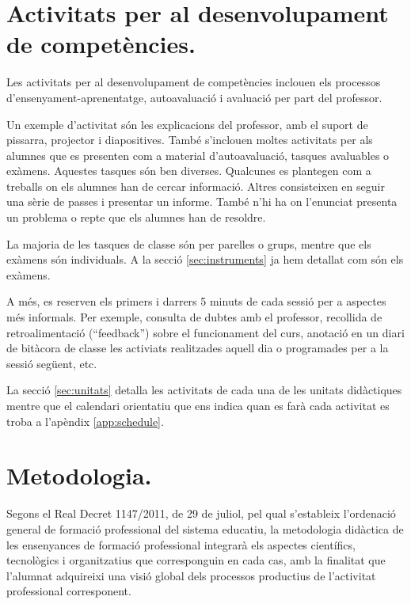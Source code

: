 \documentclass[catalan, a4paper, 12pt, titlepage]{article}
\begin{document}
\section{Activitats per al desenvolupament de competències.}
\label{sec:activitats}

Les activitats per al desenvolupament de competències inclouen els processos d'ensenyament-aprenentatge, autoavaluació i avaluació per part del professor.

Un exemple d'activitat són les explicacions del professor, amb el suport de pissarra, projector i diapositives.
També s'inclouen moltes activitats  per als alumnes que es presenten com a material d'autoavaluació, tasques avaluables o exàmens.
Aquestes tasques són ben diverses.
Qualcunes es plantegen com a treballs on els alumnes han de cercar informació.
Altres consisteixen en seguir una sèrie de passes i presentar un informe.
També n'hi ha on l'enunciat presenta un problema o repte que els alumnes han de resoldre.

La majoria de les tasques de classe són per parelles o grups, mentre que els exàmens són individuals.
A la secció \ref{sec:instruments} ja hem detallat com són els exàmens.

A més, es reserven els primers i darrers 5 minuts de cada sessió per a aspectes més informals.
Per exemple, consulta de dubtes amb el professor, recollida de retroalimentació (``feedback'') sobre el funcionament del curs, anotació en un diari de bitàcora de classe les activiats realitzades aquell dia o programades per a la sessió següent, etc.

La secció \ref{sec:unitats} detalla les activitats de cada una de les unitats didàctiques mentre que el calendari orientatiu que ens indica quan es farà cada activitat es troba a l'apèndix \ref{app:schedule}.

\section{Metodologia.}
\label{sec:metodologia}

Segons el Real Decret 1147/2011, de 29 de juliol, pel qual s'estableix l'ordenació general de formació professional del sistema educatiu, la metodologia didàctica de les ensenyances de formació professional integrarà els aspectes científics, tecnològics i organitzatius que corresponguin en cada cas, amb la finalitat que l'alumnat adquireixi una visió global dels processos productius de l'activitat professional corresponent.
\end{document}
